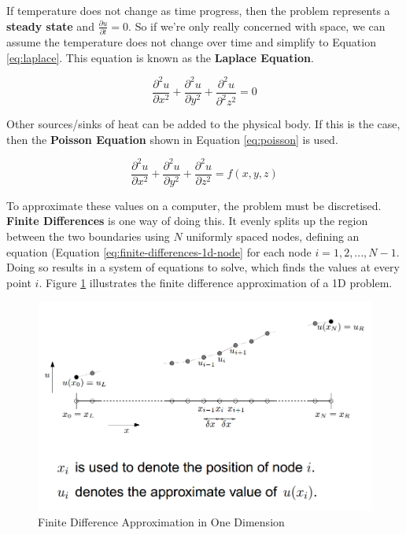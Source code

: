 \documentclass{article}
\begin{document}
If temperature does not change as time progress, then the problem represents a \textbf{steady state} and $\frac{\partial u}{\partial t} = 0$. So if we're only really concerned with space, we can assume the temperature does not change over time and simplify to Equation \ref{eq:laplace}. This equation is known as the \textbf{Laplace Equation}.

\begin{equation}
	\frac{\partial^2 u}{\partial x^2} + \frac{\partial^2 u}{\partial y^2} + \frac{\partial^2 u}{\partial^2 z^2} = 0
	\label{eq:laplace}
\end{equation}

Other sources/sinks of heat can be added to the physical body. If this is the case, then the \textbf{Poisson Equation} shown in Equation \ref{eq:poisson} is used.

\begin{equation}
	\frac{\partial^2 u}{\partial x^2} + \frac{\partial^2 u}{\partial y^2} + \frac{\partial^2 u}{\partial z^2} = f(x, y, z)
	\label{eq:poisson}
\end{equation}

To approximate these values on a computer, the problem must be discretised. \textbf{Finite Differences} is one way of doing this. It evenly splits up the region between the two boundaries using $N$ uniformly spaced nodes, defining an equation (Equation \ref{eq:finite-differences-1d-node} for each node $i = 1, 2, ..., N - 1$. Doing so results in a system of equations to solve, which finds the values at every point $i$. Figure \ref{fig:finite-differences} illustrates the finite difference approximation of a 1D problem.

\begin{figure}
	\centering
	\includegraphics[scale=0.35]{figures/1d-finite-differences.png}
	\caption{Finite Difference Approximation in One Dimension}
	\label{fig:finite-differences}
\end{figure}
\end{document}
